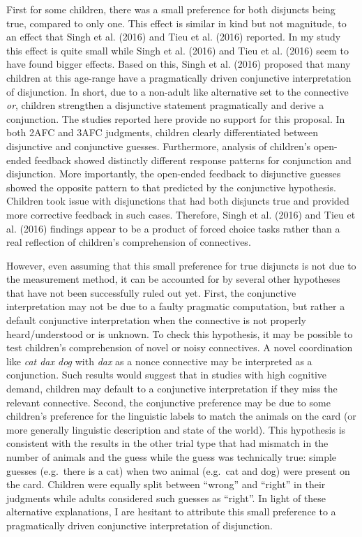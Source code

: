 \documentclass[oneside]{report}
\theoremstyle{definition}
\theoremstyle{definition}
\theoremstyle{definition}
\theoremstyle{remark}
\begin{document}
First for some children, there was a small preference for both disjuncts
being true, compared to only one. This effect is similar in kind but not
magnitude, to an effect that Singh et al. (2016) and Tieu et al. (2016)
reported. In my study this effect is quite small while Singh et al.
(2016) and Tieu et al. (2016) seem to have found bigger effects. Based
on this, Singh et al. (2016) proposed that many children at this
age-range have a pragmatically driven conjunctive interpretation of
disjunction. In short, due to a non-adult like alternative set to the
connective \emph{or}, children strengthen a disjunctive statement
pragmatically and derive a conjunction. The studies reported here
provide no support for this proposal. In both 2AFC and 3AFC judgments,
children clearly differentiated between disjunctive and conjunctive
guesses. Furthermore, analysis of children's open-ended feedback showed
distinctly different response patterns for conjunction and disjunction.
More importantly, the open-ended feedback to disjunctive guesses showed
the opposite pattern to that predicted by the conjunctive hypothesis.
Children took issue with disjunctions that had both disjuncts true and
provided more corrective feedback in such cases. Therefore, Singh et al.
(2016) and Tieu et al. (2016) findings appear to be a product of forced
choice tasks rather than a real reflection of children's comprehension
of connectives.

However, even assuming that this small preference for true disjuncts is
not due to the measurement method, it can be accounted for by several
other hypotheses that have not been successfully ruled out yet. First,
the conjunctive interpretation may not be due to a faulty pragmatic
computation, but rather a default conjunctive interpretation when the
connective is not properly heard/understood or is unknown. To check this
hypothesis, it may be possible to test children's comprehension of novel
or noisy connectives. A novel coordination like \emph{cat dax dog} with
\emph{dax} as a nonce connective may be interpreted as a conjunction.
Such results would suggest that in studies with high cognitive demand,
children may default to a conjunctive interpretation if they miss the
relevant connective. Second, the conjunctive preference may be due to
some children's preference for the linguistic labels to match the
animals on the card (or more generally linguistic description and state
of the world). This hypothesis is consistent with the results in the
other trial type that had mismatch in the number of animals and the
guess while the guess was technically true: simple guesses (e.g.~there
is a cat) when two animal (e.g.~cat and dog) were present on the card.
Children were equally split between ``wrong'' and ``right'' in their
judgments while adults considered such guesses as ``right''. In light of
these alternative explanations, I are hesitant to attribute this small
preference to a pragmatically driven conjunctive interpretation of
disjunction.
\end{document}
